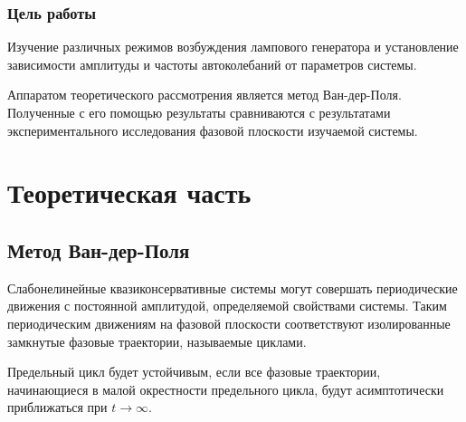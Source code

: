 
\usepackage{xcolor}
\usepackage{float}
\usepackage{hyperref}
\hypersetup{unicode=true}
\hypersetup{pdfstartview=FitH,  linkcolor=linkcolor,urlcolor=urlcolor, colorlinks=true}

	\sloppy
	\def\authors{Есюнин М.В., Есюнин Д.В.}
	\def\labname{Фазовая плоскость лампового генератора}
	\def\shortlabname{Ламповый генератор}
	\def\sciadviser{Половинкин А.В.}
	\renewcommand{\contentsname}{Оглавление}
	\renewcommand{\figurename}{Рис.}
	\renewcommand{\tablename}{Табл.}
	\renewcommand{\vec}{\mathbf}
	\renewcommand{\phi}{\varphi}
	\renewcommand{\kappa}{\varkappa}
	\renewcommand{\Re}{\operatorname{Re}}
	\renewcommand{\Im}{\operatorname{Im}}
	
	\begin{spacing}{1.2}
		\tableofcontents
	\end{spacing}
\subsubsection*{Цель работы} Изучение различных режимов возбуждения лампового генератора и установление зависимости амплитуды и частоты автоколебаний от параметров системы.

Аппаратом теоретического рассмотрения является метод Ван-дер-Поля. Полученные с его помощью результаты сравниваются с результатами экспериментального исследования фазовой плоскости изучаемой системы. 

\section{Теоретическая часть}
 
\subsection{ Метод Ван-дер-Поля}
Слабонелинейные квазиконсервативные системы могут совершать периодические движения с постоянной амплитудой, определяемой свойствами системы. Таким периодическим движениям на фазовой плоскости соответствуют изолированные замкнутые фазовые траектории, называемые { циклами}.

Предельный цикл будет устойчивым, если все фазовые траектории, начинающиеся в малой окрестности предельного цикла, будут асимптотически приближаться при $t\to\infty$.

